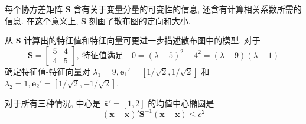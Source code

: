每个协方差矩阵 $\mathbf{S}$ 含有关于变量分量的可变性的信息, 还含有计算相关系数所需的信息. 在这个意义上, $\mathbf{S}$ 刻画了散布图的定向和大小.

从 $\mathbf{S}$ 计算出的特征值和特征向量可更进一步描述散布图中的模型. 对于
\[
\mathbf{S}=\begin{bmatrix}5&4\\4&5\end{bmatrix},\ \text{特征值满足}\quad 0=(\lambda-5)^{2}-4^{2}=(\lambda-9)(\lambda-1)
\]
确定特征值-特征向量对 $\lambda_{1}=9,\mathbf{e}_{1}'=[1/\sqrt{2},1/\sqrt{2}]$ 和 $\lambda_{2}=1,\mathbf{e}_{2}'=[1/\sqrt{2},-1/\sqrt{2}]$.

对于所有三种情况, 中心是 $\bar{\mathbf{x}}'=[1,2]$ 的均值中心椭圆是
\[
(\mathbf{x}-\bar{\mathbf{x}})'\mathbf{S}^{-1}(\mathbf{x}-\bar{\mathbf{x}})\le c^{2}
\]

